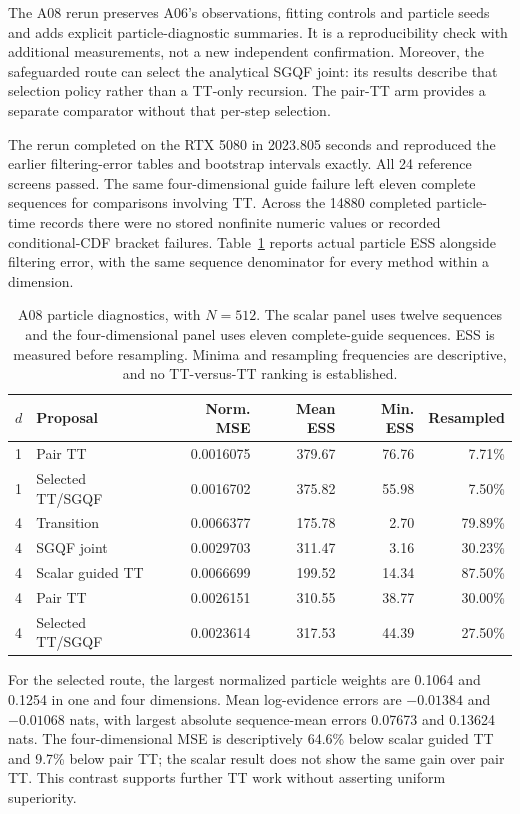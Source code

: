\documentclass[11pt]{article}
\begin{document}
The A08 rerun preserves A06's observations, fitting controls and particle
seeds and adds explicit particle-diagnostic summaries. It is a reproducibility
check with additional measurements, not a new independent confirmation.
Moreover, the safeguarded route can select the analytical SGQF joint: its
results describe that selection policy rather than a TT-only recursion.
The pair-TT arm provides a separate comparator without that per-step selection.

The rerun completed on the RTX 5080 in 2023.805 seconds and reproduced the
earlier filtering-error tables and bootstrap intervals exactly. All 24
reference screens passed. The same four-dimensional guide failure left eleven
complete sequences for comparisons involving TT. Across the 14880 completed
particle-time records there were no stored nonfinite numeric values or
recorded conditional-CDF bracket failures. Table~\ref{tab:a08-particle-ess}
reports actual particle ESS alongside filtering error, with the same sequence
denominator for every method within a dimension.

\begin{table}[htbp]
\centering\small
\begin{tabular}{llrrrr}
\toprule
$d$ & Proposal & Norm. MSE & Mean ESS & Min. ESS & Resampled\\
\midrule
1 & Pair TT & 0.0016075 & 379.67 & 76.76 & 7.71\%\\
1 & Selected TT/SGQF & 0.0016702 & 375.82 & 55.98 & 7.50\%\\
\midrule
4 & Transition & 0.0066377 & 175.78 & 2.70 & 79.89\%\\
4 & SGQF joint & 0.0029703 & 311.47 & 3.16 & 30.23\%\\
4 & Scalar guided TT & 0.0066699 & 199.52 & 14.34 & 87.50\%\\
4 & Pair TT & 0.0026151 & 310.55 & 38.77 & 30.00\%\\
4 & Selected TT/SGQF & 0.0023614 & 317.53 & 44.39 & 27.50\%\\
\bottomrule
\end{tabular}
\caption{A08 particle diagnostics, with $N=512$. The scalar panel uses twelve
sequences and the four-dimensional panel uses eleven complete-guide sequences.
ESS is measured before resampling. Minima and resampling frequencies are
descriptive, and no TT-versus-TT ranking is established.}
\label{tab:a08-particle-ess}
\end{table}

For the selected route, the largest normalized particle weights are 0.1064
and 0.1254 in one and four dimensions. Mean log-evidence errors are
$-0.01384$ and $-0.01068$ nats, with largest absolute sequence-mean errors
0.07673 and 0.13624 nats. The four-dimensional MSE is descriptively 64.6\%
below scalar guided TT and 9.7\% below pair TT; the scalar result does not
show the same gain over pair TT. This contrast supports further TT work
without asserting uniform superiority.
\end{document}
